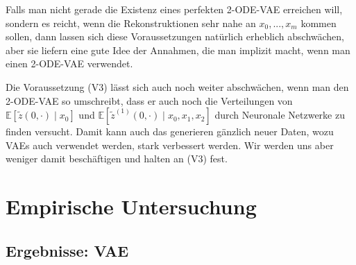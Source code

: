 \documentclass[12pt]{article}
\newcommand{\E}{\mathbb{E}}
\newcommand{\tz}{\widetilde{z}}
\begin{document}
	Falls man nicht gerade die Existenz eines perfekten 2-ODE-VAE erreichen will, sondern es reicht, wenn die Rekonstruktionen sehr nahe an $x_0,...,x_m$ kommen sollen, dann lassen sich diese Voraussetzungen natürlich erheblich abschwächen, aber sie liefern eine gute Idee der Annahmen, die man implizit macht, wenn man einen 2-ODE-VAE verwendet.

	\newpage
	\noindent

	Die Voraussetzung (V3) lässt sich auch noch weiter abschwächen, wenn man den 2-ODE-VAE so umschreibt, dass er auch noch die Verteilungen von $\E[\tz(0,\cdot) \mid x_0]$ und $\E[\tz^{(1)}(0,\cdot) \mid x_0,x_1,x_2]$ durch Neuronale Netzwerke zu finden versucht. Damit kann auch das generieren gänzlich neuer Daten, wozu VAEs auch verwendet werden, stark verbessert werden. Wir werden uns aber weniger damit beschäftigen und halten an (V3) fest.



	\section[Empirische Untersuchung]{Empirische Untersuchung}
	\subsection[VAE]{Ergebnisse: VAE}
\end{document}
